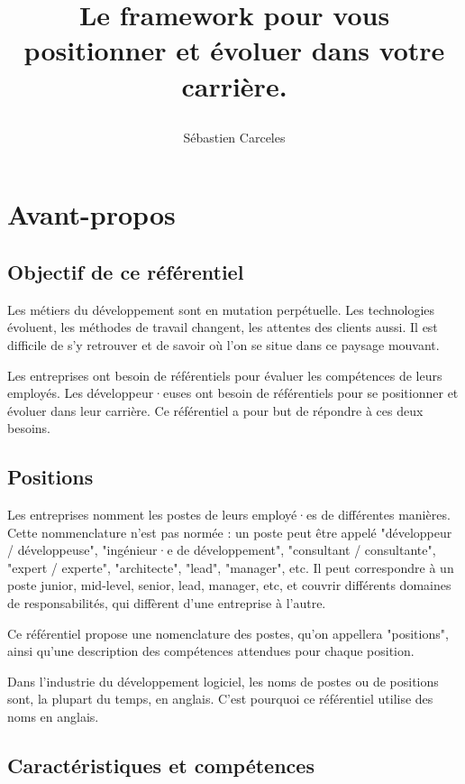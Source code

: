 \documentclass[a4paper, french, openany, 12pt]{book}
\title{
  \vspace*{-8cm}

  \fullwidthimage{images/cover.jpg}

  \vspace*{5cm}

  \bsc{Référenciel de compétences pour développeurs et développeuses}

  Le framework pour vous positionner et évoluer dans votre carrière.
}
\author{Sébastien Carceles}
\date{}
\begin{document}
\begin{titlepage}
  \maketitle
\end{titlepage}

\frontmatter

\chapter{Avant-propos}

\section*{Objectif de ce référentiel}

Les métiers du développement sont en mutation perpétuelle.
Les technologies évoluent, les méthodes de travail changent, les attentes des clients aussi.
Il est difficile de s'y retrouver et de savoir où l'on se situe dans ce paysage mouvant.

Les entreprises ont besoin de référentiels pour évaluer les compétences de leurs employés.
Les développeur·euses ont besoin de référentiels pour se positionner et évoluer dans leur carrière.
Ce référentiel a pour but de répondre à ces deux besoins.

\section*{Positions}

Les entreprises nomment les postes de leurs employé·es de différentes manières.
Cette nommenclature n'est pas normée : un poste peut être appelé "développeur / développeuse", "ingénieur·e de 
développement", "consultant / consultante", "expert / experte", "architecte", "lead", "manager", etc.
Il peut correspondre à un poste junior, mid-level, senior, lead, manager, etc, et couvrir différents domaines de 
responsabilités, qui diffèrent d'une entreprise à l'autre.

Ce référentiel propose une nomenclature des postes, qu'on appellera "positions",
ainsi qu'une description des compétences attendues pour chaque position.

Dans l'industrie du développement logiciel, les noms de postes ou de positions sont, la plupart du temps, en anglais.
C'est pourquoi ce référentiel utilise des noms en anglais.

\section*{Caractéristiques et compétences}
\end{document}
